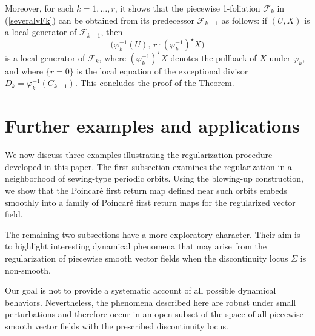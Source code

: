 \documentclass[11pt,psamsfonts]{article}
\theoremstyle{definition}
\theoremstyle{remark}
\newcommand{\vF}{\mathcal{F}}
\begin{document}
Moreover, for each $k = 1, \ldots, r$, it shows that the piecewise 1-foliation 
$\vF_{k}$ in (\ref{severalvFk}) can be obtained from its predecessor $\vF_{k-1}$ as follows: if $(U, X)$ is a local generator of $\vF_{k-1}$, then
$$\bigl(\varphi_k^{-1}(U),\, r \cdot (\varphi_k^{-1})^\star X\bigr)$$
is a local generator of $\vF_{k}$, where $(\varphi_k^{-1})^\star X$ denotes the pullback of $X$ under $\varphi_k$, and where $\{r = 0\}$ is the local equation of the exceptional divisor $D_{k} = \varphi_k^{-1}(C_{k-1})$. This concludes the proof of the Theorem.
\section{Further examples and applications}\label{s7}
We now discuss three examples illustrating the regularization procedure developed in this paper. The first subsection examines the regularization in a neighborhood of sewing-type periodic orbits. Using the blowing-up construction, we show that the Poincaré first return map defined near such orbits embeds smoothly into a family of Poincaré first return maps for the regularized vector field.

The remaining two subsections have a more exploratory character. Their aim is to highlight interesting dynamical phenomena that may arise from the regularization of piecewise smooth vector fields when the discontinuity locus $\Sigma$ is non-smooth.

Our goal is not to provide a systematic account of all possible dynamical behaviors. Nevertheless, the phenomena described here are robust under small perturbations and therefore occur in an open subset of the space of all piecewise smooth vector fields with the prescribed discontinuity locus.
\end{document}
